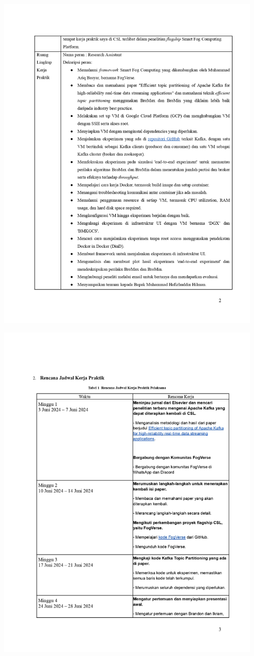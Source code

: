 \includegraphics[width=1\textwidth]{assets/pics/KAKP_Bryan Raihan Ilman_2106704351_signed_page-0002.jpg}

\includegraphics[width=1\textwidth]{assets/pics/KAKP_Bryan Raihan Ilman_2106704351_signed_page-0003.jpg}

